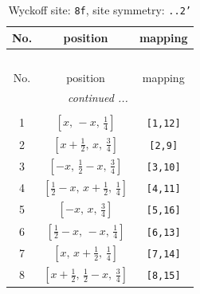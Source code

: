 \documentclass[fleqn,8pt]{jsarticle}
\begin{document}
\begin{longtable}{ccc}
\caption{Wyckoff site: {\tt 8f}, site symmetry: {\tt ..2'}}
 \\
 \hline \hline
No. & position & mapping \\ \hline \endfirsthead

\multicolumn{2}{l}{\tablename\ \thetable{}} \\
 \hline \hline
No. & position & mapping \\ \hline \endhead

 \hline \hline
\multicolumn{2}{r}{\footnotesize\it continued ...} \\ \endfoot

 \hline \hline
\multicolumn{2}{r}{} \\ \endlastfoot

1 & $\left[ x,\, - x,\, \frac{1}{4} \right]$ & {\tt [1,12]} \\ \hline
2 & $\left[ x + \frac{1}{2},\, x,\, \frac{3}{4} \right]$ & {\tt [2,9]} \\ \hline
3 & $\left[ - x,\, \frac{1}{2} - x,\, \frac{3}{4} \right]$ & {\tt [3,10]} \\ \hline
4 & $\left[ \frac{1}{2} - x,\, x + \frac{1}{2},\, \frac{1}{4} \right]$ & {\tt [4,11]} \\ \hline
5 & $\left[ - x,\, x,\, \frac{3}{4} \right]$ & {\tt [5,16]} \\ \hline
6 & $\left[ \frac{1}{2} - x,\, - x,\, \frac{1}{4} \right]$ & {\tt [6,13]} \\ \hline
7 & $\left[ x,\, x + \frac{1}{2},\, \frac{1}{4} \right]$ & {\tt [7,14]} \\ \hline
8 & $\left[ x + \frac{1}{2},\, \frac{1}{2} - x,\, \frac{3}{4} \right]$ & {\tt [8,15]} \\
\end{longtable}
\renewcommand{\arraystretch}{1.2}
\end{document}
